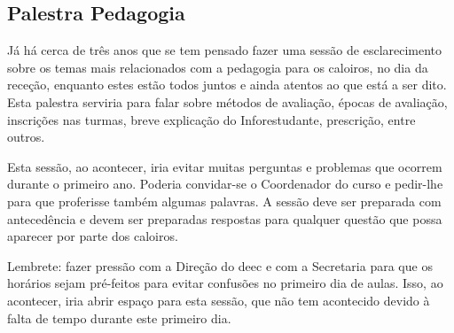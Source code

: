 
\subsection{Palestra Pedagogia}

Já há cerca de três anos que se tem pensado fazer uma sessão de esclarecimento sobre os temas mais relacionados com a pedagogia para os caloiros, no dia da receção, enquanto estes estão todos juntos e ainda atentos ao que está a ser dito. Esta palestra serviria para falar sobre métodos de avaliação, épocas de avaliação, inscrições nas turmas, breve explicação do Inforestudante, prescrição, entre outros.

Esta sessão, ao acontecer, iria evitar muitas perguntas e problemas que ocorrem durante o primeiro ano. Poderia convidar-se o Coordenador do curso e pedir-lhe para que proferisse também algumas palavras. A sessão deve ser preparada com antecedência e devem ser preparadas respostas para qualquer questão que possa aparecer por parte dos caloiros.

Lembrete: fazer pressão com a Direção do \acrshort{deec} e com a Secretaria para que os horários sejam pré-feitos para evitar confusões no primeiro dia de aulas. Isso, ao acontecer, iria abrir espaço para esta sessão, que não tem acontecido devido à falta de tempo durante este primeiro dia. 